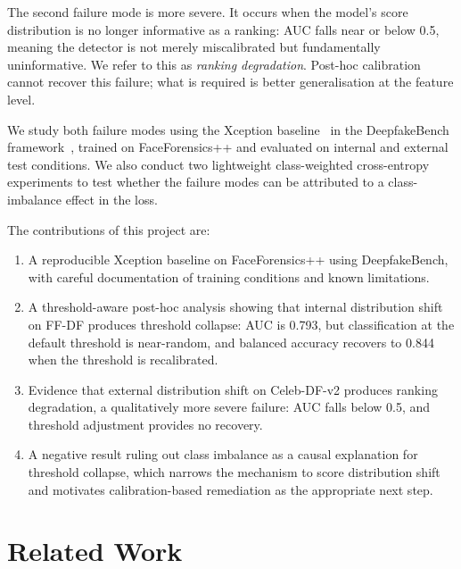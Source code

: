 \documentclass[a4paper,12pt]{report}
\begin{document}
The second failure mode is more severe.
It occurs when the model's score distribution is no longer
informative as a ranking: AUC falls near or below 0.5,
meaning the detector is not merely miscalibrated but
fundamentally uninformative.
We refer to this as \emph{ranking degradation}.
Post-hoc calibration cannot recover this failure; what is
required is better generalisation at the feature level.

We study both failure modes using the Xception
baseline~\cite{chollet2017} in the DeepfakeBench
framework~\cite{deepfakebench}, trained on FaceForensics++
and evaluated on internal and external test conditions.
We also conduct two lightweight class-weighted cross-entropy
experiments to test whether the failure modes can be
attributed to a class-imbalance effect in the loss.

\medskip
\noindent
The contributions of this project are:

\begin{enumerate}
  \item A reproducible Xception baseline on FaceForensics++
        using DeepfakeBench, with careful documentation of
        training conditions and known limitations.

  \item A threshold-aware post-hoc analysis showing that
        internal distribution shift on FF-DF produces
        threshold collapse: AUC is 0.793, but classification
        at the default threshold is near-random, and
        balanced accuracy recovers to 0.844 when the
        threshold is recalibrated.

  \item Evidence that external distribution shift on
        Celeb-DF-v2 produces ranking degradation, a
        qualitatively more severe failure: AUC falls below
        0.5, and threshold adjustment provides no recovery.

  \item A negative result ruling out class imbalance as
        a causal explanation for threshold collapse, which
        narrows the mechanism to score distribution shift
        and motivates calibration-based remediation as the
        appropriate next step.
\end{enumerate}

\chapter{Related Work}
\end{document}
